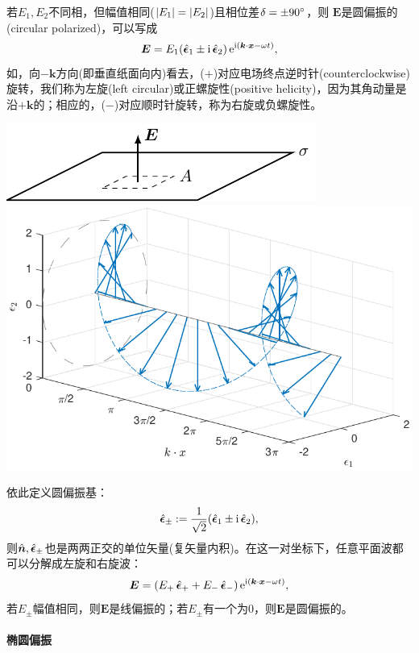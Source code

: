 若$E_1,E_2$不同相，但幅值相同($\left\lvert E_1\right\rvert=\left\lvert E_2\right\rvert$)且相位差$\delta=\pm 90^\circ$，则
$\bm E$是圆偏振的(circular polarized)，可以写成
\[
    \bm E=E_1(\mathop{}\!\hat{\bm{\epsilon}}_1\pm\mathrm{i}\mathop{}\!\hat{\bm{\epsilon}}_2)\mathop{}\!\mathrm{e}^{\mathrm{i}(\bm k\cdot\bm x-\omega t)},
\]
如，向$-\bm k$方向(即垂直纸面向内)看去，($+$)对应电场终点逆时针(counterclockwise)旋转，我们称为左旋(left circular)或正螺旋性(positive helicity)，因为其角动量是沿$+\bm k$的；相应的，($-$)对应顺时针旋转，称为右旋或负螺旋性。
\begin{center}
    \includegraphics[page=20]{figures/tikz/layouts.pdf}
    \includegraphics[width=0.5\linewidth]{figures/polarization_circ.pdf}
    \label{fig:circular polarization}
\end{center}
依此定义圆偏振基：
\begin{equation}
    \mathop{}\!\hat{\bm{\epsilon}}_\pm:=\frac1{\sqrt2}(\mathop{}\!\hat{\bm{\epsilon}}_1\pm\mathrm{i}\mathop{}\!\hat{\bm{\epsilon}}_2),
\end{equation}
则$\mathop{}\!\hat{\bm{n}},\mathop{}\!\hat{\bm{\epsilon}}_\pm$也是两两正交的单位矢量(复矢量内积)。在这一对坐标下，任意平面波都可以分解成左旋和右旋波：
\[
    \bm E=(E_+\mathop{}\!\hat{\bm{\epsilon}}_++E_-\mathop{}\!\hat{\bm{\epsilon}}_-)\mathop{}\!\mathrm{e}^{\mathrm{i}(\bm k\cdot\bm x-\omega t)},
\]
若$E_\pm$幅值相同，则$\bm E$是线偏振的；若$E_\pm$有一个为0，则$\bm E$是圆偏振的。

\paragraph{椭圆偏振}

